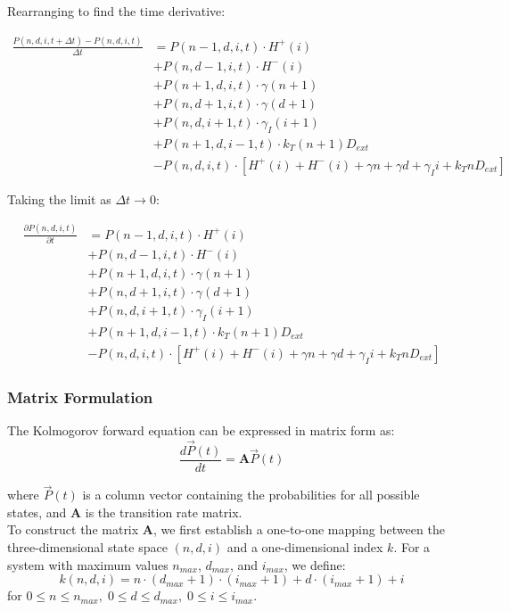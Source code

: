 \documentclass{article}
\begin{document}
\begin{flushleft}
Rearranging to find the time derivative:

\begin{align*}
\frac{P(n,d,i,t+\Delta t) - P(n,d,i,t)}{\Delta t} &= P(n-1,d,i,t) \cdot H^+(i) \\
&+ P(n,d-1,i,t) \cdot H^-(i) \\
&+ P(n+1,d,i,t) \cdot \gamma(n+1) \\
&+ P(n,d+1,i,t) \cdot \gamma(d+1) \\
&+ P(n,d,i+1,t) \cdot \gamma_I(i+1) \\
&+ P(n+1,d,i-1,t) \cdot k_T(n+1)D_{ext} \\
&- P(n,d,i,t) \cdot [H^+(i) + H^-(i) + \gamma n + \gamma d + \gamma_I i + k_T n D_{ext}]
\end{align*}

Taking the limit as $\Delta t \rightarrow 0$:

\begin{align*}
\frac{\partial P(n,d,i,t)}{\partial t} &= P(n-1,d,i,t) \cdot H^+(i) \\
&+ P(n,d-1,i,t) \cdot H^-(i) \\
&+ P(n+1,d,i,t) \cdot \gamma(n+1) \\
&+ P(n,d+1,i,t) \cdot \gamma(d+1) \\
&+ P(n,d,i+1,t) \cdot \gamma_I(i+1) \\
&+ P(n+1,d,i-1,t) \cdot k_T(n+1)D_{ext} \\
&- P(n,d,i,t) \cdot [H^+(i) + H^-(i) + \gamma n + \gamma d + \gamma_I i + k_T n D_{ext}]
\end{align*}

\subsubsection{Matrix Formulation}
The Kolmogorov forward equation can be expressed in matrix form as:
\[
\frac{d\vec{P}(t)}{dt} = \mathbf{A} \vec{P}(t)
\]

where $\vec{P}(t)$ is a column vector containing the probabilities for all possible states, and $\mathbf{A}$ is the transition rate matrix. \\

To construct the matrix $\mathbf{A}$, we first establish a one-to-one mapping between the three-dimensional state space $(n,d,i)$ and a one-dimensional index $k$. For a system with maximum values $n_{max}$, $d_{max}$, and $i_{max}$, we define:
\[
k(n,d,i) = n \cdot (d_{max}+1) \cdot (i_{max}+1) + d \cdot (i_{max}+1) + i
\]
for $0 \leq n \leq n_{max}, \; 0 \leq d \leq d_{max}, \; 0 \leq i \leq i_{max}$.


\end{flushleft}
\end{document}
